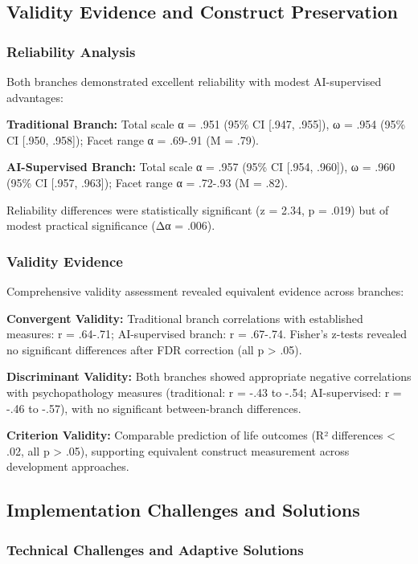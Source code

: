\documentclass[12pt,a4paper]{article}
\begin{document}
\subsection{Validity Evidence and Construct Preservation}

\subsubsection{Reliability Analysis}

Both branches demonstrated excellent reliability with modest AI-supervised advantages:

\textbf{Traditional Branch:} Total scale α = .951 (95\% CI [.947, .955]), ω = .954 (95\% CI [.950, .958]); Facet range α = .69-.91 (M = .79).

\textbf{AI-Supervised Branch:} Total scale α = .957 (95\% CI [.954, .960]), ω = .960 (95\% CI [.957, .963]); Facet range α = .72-.93 (M = .82).

Reliability differences were statistically significant (z = 2.34, p = .019) but of modest practical significance (Δα = .006).

\subsubsection{Validity Evidence}

Comprehensive validity assessment revealed equivalent evidence across branches:

\textbf{Convergent Validity:} Traditional branch correlations with established measures: r = .64-.71; AI-supervised branch: r = .67-.74. Fisher's z-tests revealed no significant differences after FDR correction (all p > .05).

\textbf{Discriminant Validity:} Both branches showed appropriate negative correlations with psychopathology measures (traditional: r = -.43 to -.54; AI-supervised: r = -.46 to -.57), with no significant between-branch differences.

\textbf{Criterion Validity:} Comparable prediction of life outcomes (R² differences < .02, all p > .05), supporting equivalent construct measurement across development approaches.

\subsection{Implementation Challenges and Solutions}

\subsubsection{Technical Challenges and Adaptive Solutions}
\end{document}
